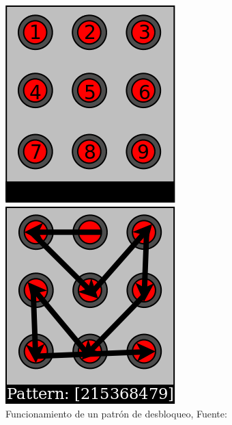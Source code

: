 \begin{anexos}
\begin{figure}[H]
	\centering
	\begin{minipage}{0.5\linewidth}  %
		\centering
		\includegraphics[width=0.7\linewidth]{0.png} %
	\end{minipage}%
	\hfill
	\begin{minipage}{0.5\linewidth} %
		\centering
		\includegraphics[width=0.7\linewidth]{1.png} %
	\end{minipage}
	\caption{Funcionamiento de un patrón de desbloqueo, Fuente: \cite{aviv2010smudge}}
	\label{android-pattern}
\end{figure}



\end{anexos}
